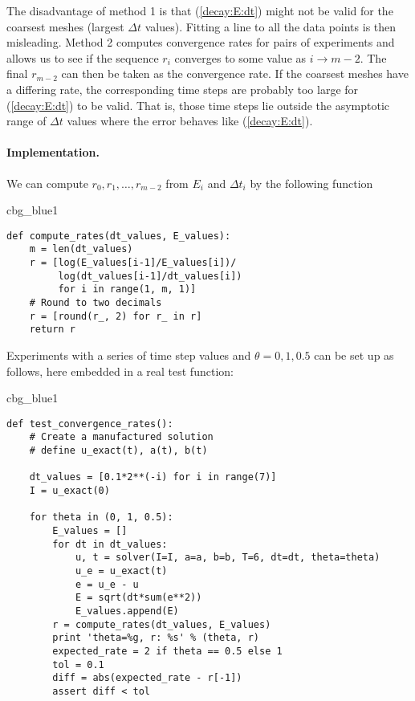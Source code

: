 \documentclass[graybox,sectrefs,envcountresetchap,open=right,final]{svmonodo}
\newenvironment{_cod_tight}[1]{
   \def\FrameCommand{\colorbox{#1}}
   \FrameRule0.6pt\MakeFramed {\FrameRestore}\vskip3mm}
   {\vskip0mm\endMakeFramed}
\newenvironment{cod}[1]{
\bgroup\rmfamily
\fboxsep=0mm\relax
\begin{_cod_tight}{#1}
\list{}{\parsep=-2mm\parskip=0mm\topsep=0pt\leftmargin=2mm
\rightmargin=2\leftmargin\leftmargin=4pt\relax}
\item\relax}
{\endlist\end{_cod_tight}\egroup}
\begin{document}
The disadvantage of method 1 is that (\ref{decay:E:dt}) might not be valid
for the coarsest meshes (largest $\Delta t$ values). Fitting a line
to all the data points is then misleading.  Method 2 computes
convergence rates for pairs of experiments and allows us to see
if the sequence $r_i$ converges to some value as $i\rightarrow m-2$.
The final $r_{m-2}$ can then be taken as the convergence rate.
If the coarsest meshes have a differing rate, the corresponding
time steps are probably too large for (\ref{decay:E:dt}) to be valid.
That is, those time steps lie outside the asymptotic range of
$\Delta t$ values where the error behaves like (\ref{decay:E:dt}).


\paragraph{Implementation.}
We can compute $r_0, r_1, \ldots, r_{m-2}$ from $E_i$ and $\Delta t_i$
by the following function

\begin{cod}{cbg_blue1}\begin{Verbatim}[numbers=none,fontsize=\fontsize{9pt}{9pt},baselinestretch=0.95,xleftmargin=2mm]
def compute_rates(dt_values, E_values):
    m = len(dt_values)
    r = [log(E_values[i-1]/E_values[i])/
         log(dt_values[i-1]/dt_values[i])
         for i in range(1, m, 1)]
    # Round to two decimals
    r = [round(r_, 2) for r_ in r]
    return r
\end{Verbatim}
\end{cod}
\noindent

Experiments with a series of time step values and $\theta=0,1,0.5$
can be set up as follows, here embedded in a real test function:

\begin{cod}{cbg_blue1}\begin{Verbatim}[numbers=none,fontsize=\fontsize{9pt}{9pt},baselinestretch=0.95,xleftmargin=2mm]
def test_convergence_rates():
    # Create a manufactured solution
    # define u_exact(t), a(t), b(t)

    dt_values = [0.1*2**(-i) for i in range(7)]
    I = u_exact(0)

    for theta in (0, 1, 0.5):
        E_values = []
        for dt in dt_values:
            u, t = solver(I=I, a=a, b=b, T=6, dt=dt, theta=theta)
            u_e = u_exact(t)
            e = u_e - u
            E = sqrt(dt*sum(e**2))
            E_values.append(E)
        r = compute_rates(dt_values, E_values)
        print 'theta=%g, r: %s' % (theta, r)
        expected_rate = 2 if theta == 0.5 else 1
        tol = 0.1
        diff = abs(expected_rate - r[-1])
        assert diff < tol
\end{Verbatim}
\end{cod}
\noindent
\end{document}

